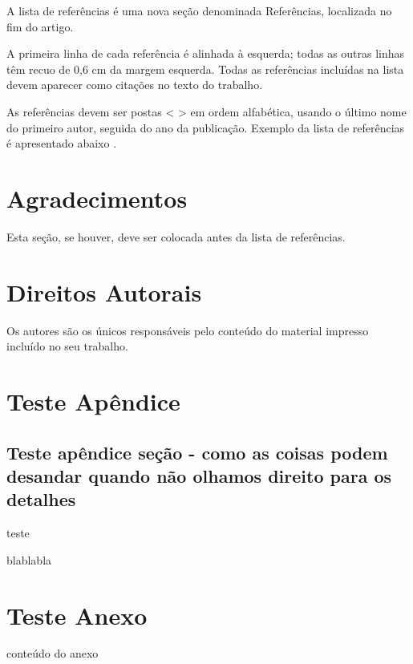 \documentclass{ufscThesis}
\begin{document}
A lista de referências é uma nova seção denominada Referências, localizada no fim do artigo.

A primeira linha de cada referência é alinhada à esquerda; todas as outras linhas têm recuo de 0,6 cm da margem esquerda. Todas as referências incluídas na lista devem aparecer como citações no texto do trabalho.

As referências devem ser postas < > em ordem alfabética, usando o último nome do primeiro autor, seguida do ano da publicação. Exemplo da lista de referências é apresentado abaixo \cite{Rocha-2010-Teste}.

\chapter{Agradecimentos}
Esta seção, se houver, deve ser colocada antes da lista de referências.

\chapter{Direitos Autorais}
Os autores são os únicos responsáveis pelo conteúdo do material impresso incluído no seu trabalho.





\apendice
\chapter{Teste Apêndice}
\section{Teste apêndice seção - como as coisas podem desandar quando não olhamos direito para os detalhes}
teste

blablabla

\anexo
\chapter{Teste Anexo}
conteúdo do anexo
\end{document}
